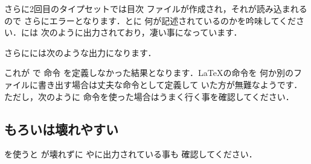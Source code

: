 さらに2回目のタイプセットでは目次
ファイルが作成され，それが読み込まれるので
さらにエラーとなります．とに
何が記述されているのかを吟味してください．には
次のように出力されており，凄い事になっています．

\begin{intext}
\relax
{}
\end{intext}

さらにには次のような出力になります．

\begin{intext}
\end{intext}

これが で 命令
を定義しなかった結果となります．{\LaTeX}の命令を
何か別のファイルに書き出す場合は丈夫な命令として定義して
いた方が無難なようです．ただし，次のように 
命令を使った場合はうまく行く事を確認してください．

\begin{intext}
\section{もろい{\protect\moroiyen}は壊れやすい} 
\end{intext}

を使うと が壊れずに
やに出力されている事も
確認してください．

%


